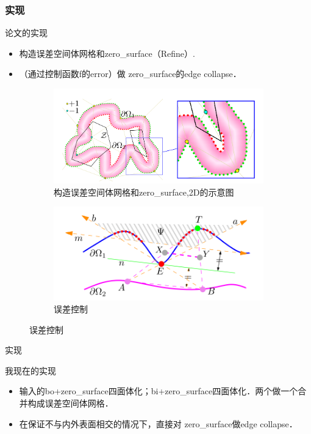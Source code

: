 \documentclass{beamer}
\begin{document}
\begin{frame}
  \frametitle{实现}
  \begin{block}{论文的实现}
    \begin{itemize}
      \item 构造误差空间体网格和zero\_surface（Refine）.
      \item （通过控制函数f的error）做 zero\_surface的edge collapse．
    \end{itemize}
  \end{block}

  \begin{figure}
    \begin{subfigure}[b]{0.4\textwidth}
      \includegraphics[width=\textwidth]{2.png}
      \caption[a]{构造误差空间体网格和zero\_surface,2D的示意图}
    \end{subfigure}
    \begin{subfigure}[b]{0.4\textwidth}
      \includegraphics[width=\textwidth]{8.png}
      \caption[b]{误差控制}
    \end{subfigure}
  \end{figure}
\end{frame}

\begin{frame}{实现}
  \begin{block}{我现在的实现}
    \begin{itemize}
      \item 输入的bo+zero\_surface四面体化；bi+zero\_surface四面体化．两个做一个合并构成误差空间体网格．
      \item 在保证不与内外表面相交的情况下，直接对 zero\_surface做edge collapse．
    \end{itemize}
  \end{block}
\end{frame}
\end{document}
